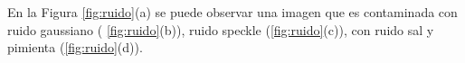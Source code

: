 En la Figura \ref{fig:ruido}(a) se puede observar una imagen que es contaminada con ruido gaussiano ( \ref{fig:ruido}(b)), ruido speckle (\ref{fig:ruido}(c)), con ruido sal y pimienta (\ref{fig:ruido}(d)). 



